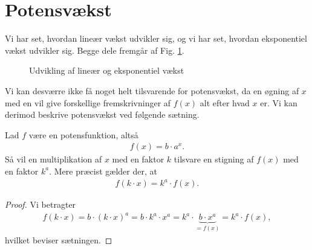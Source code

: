 \documentclass[12pt]{article}
\begin{document}
\section*{Potensvækst}
Vi har set, hvordan lineær vækst udvikler sig, og vi har set, hvordan eksponentiel vækst udvikler sig. Begge dele fremgår af Fig. \ref{fig:lineks}.
\begin{figure}[H]
\centering
{}
\caption{Udvikling af lineær og eksponentiel vækst}
\label{fig:lineks}
\end{figure}
Vi kan desværre ikke få noget helt tilsvarende for potensvækst, da en øgning af $x$ med en vil give forskellige fremskrivninger af $f(x)$ alt efter hvad $x$ er. Vi kan derimod beskrive potensvækst ved følgende sætning.
\begin{setn}
Lad $f$ være en potensfunktion, altså 
\begin{align*}
f(x) = b\cdot a^x.
\end{align*}
Så vil en multiplikation af $x$ med en faktor $k$ tilsvare en stigning af $f(x)$ med en faktor $k^a$. Mere præcist gælder der, at 
\begin{align*}
f(k\cdot x) = k^a\cdot f(x).
\end{align*}
\end{setn}
\begin{proof}
Vi betragter 
\begin{align*}
f(k\cdot x) = b\cdot (k\cdot x)^a = b \cdot k^a \cdot x^a = k^a\cdot\underbrace{b\cdot x^a}_{=f(x)} = k^a \cdot f(x),
\end{align*}
hvilket beviser sætningen. 
\end{proof}
\end{document}
